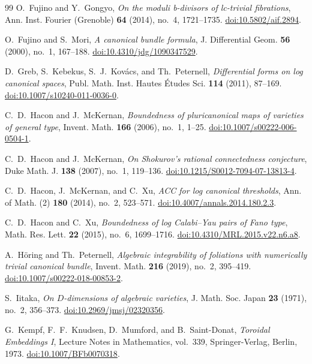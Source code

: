 \begin{thebibliography}{99}
O.~Fujino and Y.~Gongyo,
\emph{On the moduli b-divisors of lc-trivial fibrations},
Ann. Inst. Fourier (Grenoble) \textbf{64} (2014), no.~4, 1721--1735.
\href{https://doi.org/10.5802/aif.2894}{doi:10.5802/aif.2894}.

O.~Fujino and S.~Mori, \emph{A canonical bundle formula},
J. Differential Geom. \textbf{56} (2000), no.~1, 167--188.
\href{https://doi.org/10.4310/jdg/1090347529}{doi:10.4310/jdg/1090347529}.

D.~Greb, S.~Kebekus, S.~J.~Kov\'acs, and Th.~Peternell,
\emph{Differential forms on log canonical spaces},
Publ. Math. Inst. Hautes \'Etudes Sci. \textbf{114} (2011), 87--169.
\href{https://doi.org/10.1007/s10240-011-0036-0}{doi:10.1007/s10240-011-0036-0}.

C.~D.~Hacon and J.~McKernan,
\emph{Boundedness of pluricanonical maps of varieties of general type},
Invent. Math. \textbf{166} (2006), no.~1, 1--25.
\href{https://doi.org/10.1007/s00222-006-0504-1}{doi:10.1007/s00222-006-0504-1}.

C.~D.~Hacon and J.~McKernan,
\emph{On Shokurov's rational connectedness conjecture},
Duke Math. J. \textbf{138} (2007), no.~1, 119--136.
\href{https://doi.org/10.1215/S0012-7094-07-13813-4}{doi:10.1215/S0012-7094-07-13813-4}.

C.~D.~Hacon, J.~McKernan, and C.~Xu,
\emph{ACC for log canonical thresholds},
Ann. of Math. (2) \textbf{180} (2014), no.~2, 523--571.
\href{https://doi.org/10.4007/annals.2014.180.2.3}{doi:10.4007/annals.2014.180.2.3}.

C.~D.~Hacon and C.~Xu,
\emph{Boundedness of log Calabi--Yau pairs of Fano type},
Math. Res. Lett. \textbf{22} (2015), no.~6, 1699--1716.
\href{https://doi.org/10.4310/MRL.2015.v22.n6.a8}{doi:10.4310/MRL.2015.v22.n6.a8}.

A.~H\"oring and Th.~Peternell,
\emph{Algebraic integrability of foliations with numerically trivial canonical bundle},
Invent. Math. \textbf{216} (2019), no.~2, 395--419.
\href{https://doi.org/10.1007/s00222-018-00853-2}{doi:10.1007/s00222-018-00853-2}.

S.~Iitaka, \emph{On $D$-dimensions of algebraic varieties},
J. Math. Soc. Japan \textbf{23} (1971), no.~2, 356--373.
\href{https://doi.org/10.2969/jmsj/02320356}{doi:10.2969/jmsj/02320356}.

G.~Kempf, F.~F.~Knudsen, D.~Mumford, and B.~Saint-Donat,
\emph{Toroidal Embeddings I},
Lecture Notes in Mathematics, vol.~339, Springer-Verlag, Berlin, 1973.
\href{https://doi.org/10.1007/BFb0070318}{doi:10.1007/BFb0070318}.


\end{thebibliography}
